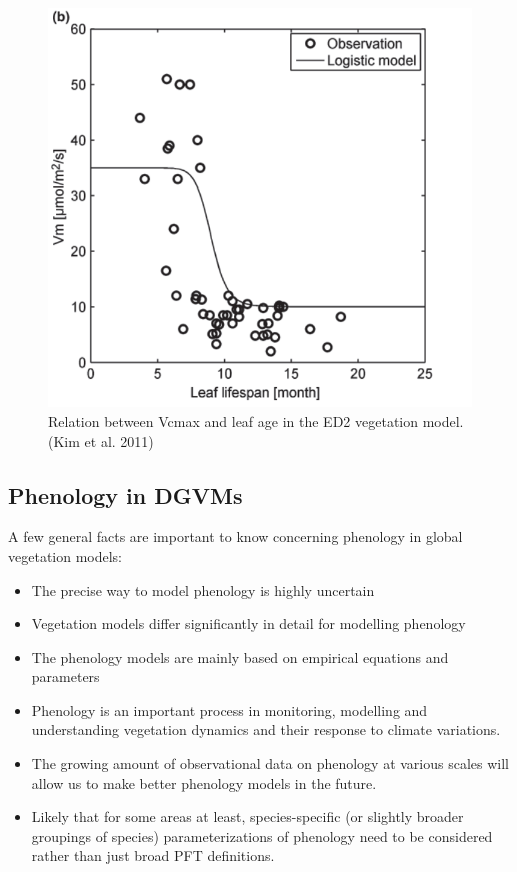\documentclass[12pt,oneside]{book}
\begin{document}
\begin{figure}

{\centering \includegraphics[width=0.8\linewidth]{figures/chap4/f46_vc_age} 

}

\caption{Relation  between Vcmax and leaf age in the ED2 vegetation model. (Kim et al. 2011)}\label{fig:f46}
\end{figure}

\subsection{Phenology in DGVMs}\label{phenology-in-dgvms}

A few general facts are important to know concerning phenology in global
vegetation models:

\begin{itemize}
\item
  The precise way to model phenology is highly uncertain
\item
  Vegetation models differ significantly in detail for modelling
  phenology
\item
  The phenology models are mainly based on empirical equations and
  parameters
\item
  Phenology is an important process in monitoring, modelling and
  understanding vegetation dynamics and their response to climate
  variations.
\item
  The growing amount of observational data on phenology at various
  scales will allow us to make better phenology models in the future.
\item
  Likely that for some areas at least, species-specific (or slightly
  broader groupings of species) parameterizations of phenology need to
  be considered rather than just broad PFT definitions.
\end{itemize}
\end{document}
